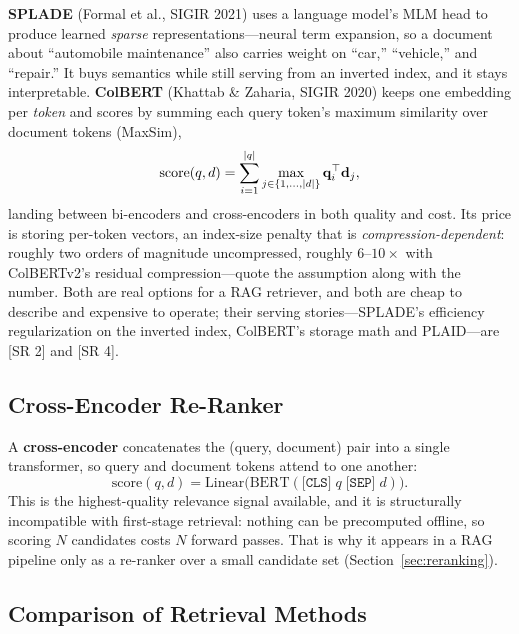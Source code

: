 \textbf{SPLADE} (Formal et al., SIGIR 2021) uses a language model's MLM head to
produce learned \emph{sparse} representations---neural term expansion, so a
document about ``automobile maintenance'' also carries weight on ``car,''
``vehicle,'' and ``repair.''  It buys semantics while still serving from an
inverted index, and it stays interpretable.  \textbf{ColBERT} (Khattab \&
Zaharia, SIGIR 2020) keeps one embedding per \emph{token} and scores by summing
each query token's maximum similarity over document tokens (MaxSim),
\[
    \text{score}(q, d) = \sum_{i=1}^{|q|} \max_{j \in \{1,\ldots,|d|\}} \mathbf{q}_i^\top \mathbf{d}_j,
\]
landing between bi-encoders and cross-encoders in both quality and cost.  Its
price is storing per-token vectors, an index-size penalty that is
\emph{compression-dependent}: roughly two orders of magnitude uncompressed,
roughly $6$--$10\times$ with ColBERTv2's residual compression---quote the
assumption along with the number.  Both are real options for a RAG retriever,
and both are cheap to describe and expensive to operate; their serving
stories---SPLADE's efficiency regularization on the inverted index, ColBERT's
storage math and PLAID---are [SR 2] and [SR 4].

\subsection{Cross-Encoder Re-Ranker}

A \textbf{cross-encoder} concatenates the (query, document) pair into a single
transformer, so query and document tokens attend to one another:
\[
    \text{score}(q, d) = \text{Linear}\!\bigl(\text{BERT}(\texttt{[CLS]}\; q \;\texttt{[SEP]}\; d)\bigr).
\]
This is the highest-quality relevance signal available, and it is structurally
incompatible with first-stage retrieval: nothing can be precomputed offline,
so scoring $N$ candidates costs $N$ forward passes.  That is why it appears in
a RAG pipeline only as a re-ranker over a small candidate set
(Section~\ref{sec:reranking}).

\subsection{Comparison of Retrieval Methods}

